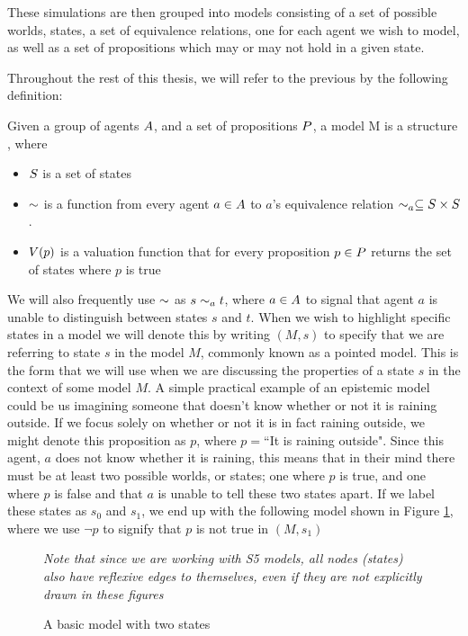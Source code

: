 These simulations are then grouped into models consisting of a set of possible worlds, states, a set of equivalence relations, one for each agent we wish to model, as well as a set of propositions which may or may not hold in a given state. 

Throughout the rest of this thesis, we will refer to the previous by the following definition: 
\begin{definition}[Models]\label{def:model}
	Given a group of agents $A$, and a set of propositions $P$, a model M is a structure \model{} , where
	\begin{itemize}
		\item $S$ is a set of states
		\item $\sim$ is a function from every agent $a \in A$ to $a$'s equivalence relation $\sim_a \subseteq S\times S$. 
		\item $V(p)$ is a valuation function that for every proposition $p \in P$ returns the set of states where $p$ is true
	\end{itemize}
\end{definition}

We will also frequently use $\sim$ as $s\sim_a t$, where $a\in A$ to signal that agent $a$ is unable to distinguish between states $s$ and $t$. When we wish to highlight specific states in a model we will denote this by writing $(M,s)$ to specify that we are referring to state $s$ in the model $M$, commonly known as a pointed model. This is the form that we will use when we are discussing the properties of a state $s$ in the context of some model $M$. A simple practical example of an epistemic model could be us imagining someone that doesn't know whether or not it is raining outside. If we focus solely on whether or not it is in fact raining outside, we might denote this proposition as $p$, where $p = $``It is raining outside". Since this agent, $a$ does not know whether it is raining, this means that in their mind there must be at least two possible worlds, or states; one where $p$ is true, and one where $p$ is false and that $a$ is unable to tell these two states apart. If we label these states as $s_0$ and $s_1$, we end up with the following model shown in Figure \ref{fig:basicEM}, where we use $\neg p$ to signify that $p$ is not true in $(M,s_1)$

\begin{figure}[h]
	\label{fig:basicEM}
	\caption{A basic model with two states}
	\centering
	\break \textit{Note that since we are working with S5 models, all nodes (states) also have reflexive edges to themselves, even if they are not explicitly drawn in these figures}
\end{figure}

